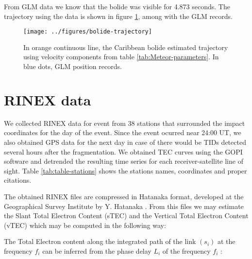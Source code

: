 From GLM data we know that the bolide was visible for 4.873 seconds. The trajectory using the data is shown in figure  \ref{fig:bolide-trajectory}, among with the GLM records.

\begin{figure}
    \centering
    \texttt{[image: ../figures/bolide-trajectory]}
    \caption{In orange continuous line, the Caribbean bolide estimated trajectory using velocity components from table \ref{tab:Meteor-parameters}. In blue dots, GLM position records.}
    \label{fig:bolide-trajectory}
\end{figure}

 

  \section{RINEX data}
  \label{sec:GPS-data}
  We collected RINEX data for event from 38 stations that surrounded the impact coordinates for the day of the event. Since the event ocurred near 24:00 UT, we also obtained GPS data for the next day in case of there would be TIDs detected several hours after the fragmentation. We obtained TEC curves using the GOPI software and detrended the resulting time series for each receiver-satellite line of sight. %
  Table \ref{tab:table-stations} shows the stations names, coordinates and proper citations.
  
  
  
   The obtained RINEX files are compressed in Hatanaka format, developed at the Geographical Survey Institute by Y. Hatanaka \citep{Kumar:2012}. From this files we may estimate the Slant Total Electron Content (sTEC) and the Vertical Total Electron Content (vTEC) which may be computed in the following way:

  The Total Electron content along the integrated path of the link $(s_i)$ at the frequency $f_i$ can be inferred from the phase delay $L_i$ of the frequency $f_i$ \citep{Emery:2017}:
  
